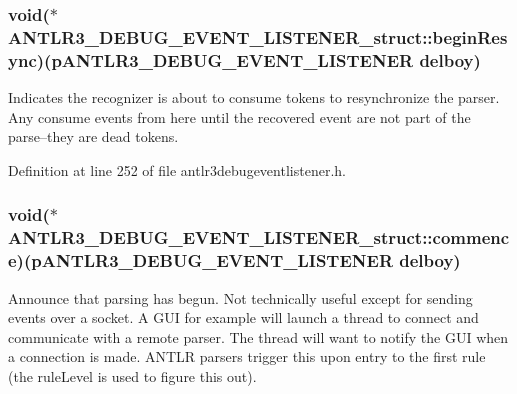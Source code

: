 \hypertarget{struct_a_n_t_l_r3___d_e_b_u_g___e_v_e_n_t___l_i_s_t_e_n_e_r__struct_a0c910c11c19fedc74640fa240ad2bdc4}{
\subsubsection[{begin\-Resync}]{\setlength{\rightskip}{0pt plus 5cm}void($\ast$ A\-N\-T\-L\-R3\-\_\-\-D\-E\-B\-U\-G\-\_\-\-E\-V\-E\-N\-T\-\_\-\-L\-I\-S\-T\-E\-N\-E\-R\-\_\-struct\-::begin\-Resync)({\bf p\-A\-N\-T\-L\-R3\-\_\-\-D\-E\-B\-U\-G\-\_\-\-E\-V\-E\-N\-T\-\_\-\-L\-I\-S\-T\-E\-N\-E\-R} delboy)}}\label{struct_a_n_t_l_r3___d_e_b_u_g___e_v_e_n_t___l_i_s_t_e_n_e_r__struct_a0c910c11c19fedc74640fa240ad2bdc4}
Indicates the recognizer is about to consume tokens to resynchronize the parser. Any consume events from here until the recovered event are not part of the parse--they are dead tokens. 

Definition at line 252 of file antlr3debugeventlistener.\-h.

\hypertarget{struct_a_n_t_l_r3___d_e_b_u_g___e_v_e_n_t___l_i_s_t_e_n_e_r__struct_a8f0d972dc2a671daaa530c0929fd2dfc}{
\subsubsection[{commence}]{\setlength{\rightskip}{0pt plus 5cm}void($\ast$ A\-N\-T\-L\-R3\-\_\-\-D\-E\-B\-U\-G\-\_\-\-E\-V\-E\-N\-T\-\_\-\-L\-I\-S\-T\-E\-N\-E\-R\-\_\-struct\-::commence)({\bf p\-A\-N\-T\-L\-R3\-\_\-\-D\-E\-B\-U\-G\-\_\-\-E\-V\-E\-N\-T\-\_\-\-L\-I\-S\-T\-E\-N\-E\-R} delboy)}}\label{struct_a_n_t_l_r3___d_e_b_u_g___e_v_e_n_t___l_i_s_t_e_n_e_r__struct_a8f0d972dc2a671daaa530c0929fd2dfc}
Announce that parsing has begun. Not technically useful except for sending events over a socket. A G\-U\-I for example will launch a thread to connect and communicate with a remote parser. The thread will want to notify the G\-U\-I when a connection is made. A\-N\-T\-L\-R parsers trigger this upon entry to the first rule (the rule\-Level is used to figure this out). 

